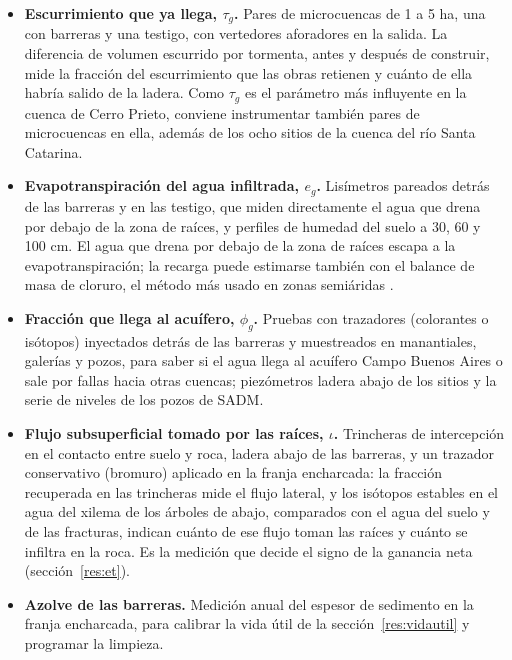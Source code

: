 \begin{itemize}
  \item \textbf{Escurrimiento que ya llega, $\tau_g$.} Pares de microcuencas de 1 a 5 ha, una con barreras y una testigo, con vertedores aforadores en la salida. La diferencia de volumen escurrido por tormenta, antes y después de construir, mide la fracción del escurrimiento que las obras retienen y cuánto de ella habría salido de la ladera. Como $\tau_g$ es el parámetro más influyente en la cuenca de Cerro Prieto, conviene instrumentar también pares de microcuencas en ella, además de los ocho sitios de la cuenca del río Santa Catarina.
  \item \textbf{Evapotranspiración del agua infiltrada, $e_g$.} Lisímetros pareados detrás de las barreras y en las testigo, que miden directamente el agua que drena por debajo de la zona de raíces, y perfiles de humedad del suelo a 30, 60 y 100 cm. El agua que drena por debajo de la zona de raíces escapa a la evapotranspiración; la recarga puede estimarse también con el balance de masa de cloruro, el método más usado en zonas semiáridas .
  \item \textbf{Fracción que llega al acuífero, $\phi_g$.} Pruebas con trazadores (colorantes o isótopos) inyectados detrás de las barreras y muestreados en manantiales, galerías y pozos, para saber si el agua llega al acuífero Campo Buenos Aires o sale por fallas hacia otras cuencas; piezómetros ladera abajo de los sitios y la serie de niveles de los pozos de SADM.
  \item \textbf{Flujo subsuperficial tomado por las raíces, $\iota$.} Trincheras de intercepción en el contacto entre suelo y roca, ladera abajo de las barreras, y un trazador conservativo (bromuro) aplicado en la franja encharcada: la fracción recuperada en las trincheras mide el flujo lateral, y los isótopos estables en el agua del xilema de los árboles de abajo, comparados con el agua del suelo y de las fracturas, indican cuánto de ese flujo toman las raíces y cuánto se infiltra en la roca. Es la medición que decide el signo de la ganancia neta (sección~\ref{res:et}).
  \item \textbf{Azolve de las barreras.} Medición anual del espesor de sedimento en la franja encharcada, para calibrar la vida útil de la sección~\ref{res:vidautil} y programar la limpieza.
\end{itemize}


